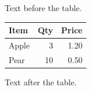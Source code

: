 \documentclass[12pt]{article}
\begin{document}
Text before the table.

\begin{tabular}{lrr}\toprule Item & Qty & Price\\\midrule Apple & 3 & 1.20\\Pear & 10 & 0.50\\\bottomrule\end{tabular}

Text after the table.
\end{document}
